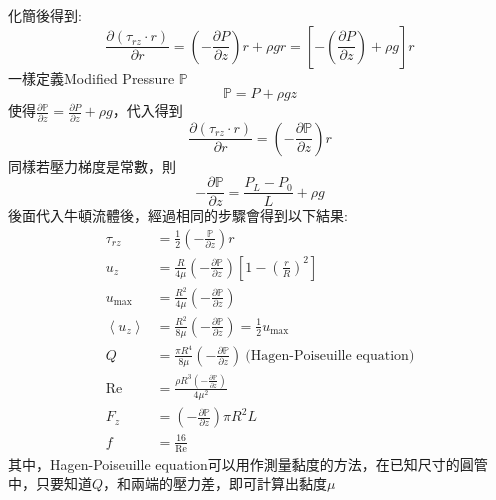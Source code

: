 \documentclass[../main.tex]{subfiles}
\begin{document}
\begin{itemize}
\begin{equation}
    \end{equation}
    化簡後得到:
    \begin{equation}
      \frac{\partial\left(\tau_{rz}\cdot r\right)}{\partial r} = 
      \left(-\frac{\partial P}{\partial z}\right)r + \rho g r = \left[
        -\left(\frac{\partial P}{\partial z}\right) + \rho g
      \right]r
    \end{equation}
    一樣定義Modified Pressure $\mathbb{P}$
    \begin{equation}
      \mathbb{P} = P + \rho g z
    \end{equation}
    使得$\frac{\partial \mathbb{P}}{\partial z} = \frac{\partial P}{\partial z} + \rho g$，代入得到
    \begin{equation}
      \frac{\partial\left(\tau_{rz}\cdot r\right)}{\partial r} = \left(-\frac{\partial \mathbb{P}}{\partial z}\right)r
    \end{equation}
    同樣若壓力梯度是常數，則
    \begin{equation}
      -\frac{\partial \mathbb{P}}{\partial z} = \frac{P_L-P_0}{L} + \rho g
    \end{equation}
    後面代入牛頓流體後，經過相同的步驟會得到以下結果:
    \begin{align}
      \tau_{rz} &= \boxed{\frac{1}{2}\left(-\frac{\mathbb P}{\partial z}\right)r} \label{eq:ch2_laminar_flow_circular_pipe_shear_stress}\\
      u_z & = \boxed{\frac{R}{4\mu}\left(-\frac{\partial \mathbb P}{\partial z}\right)\left[
        1-\left(\frac{r}{R}\right)^2
      \right]} \\
      u_{\text{max}} &= \boxed{\frac{R^2}{4\mu}\left(-\frac{\partial \mathbb P}{\partial z}\right)} \\
      \left<u_z\right> &= \frac{R^2}{8\mu}\left(-\frac{\partial \mathbb P}{\partial z}\right)  = \boxed{\frac{1}{2}u_{\text{max}}}\\
      Q &= \boxed{\frac{\pi R^4}{8\mu}\left(-\frac{\partial \mathbb P}{\partial z}\right) ~\text{(Hagen-Poiseuille equation)}} \\
      \text{Re} &= \frac{\rho R^3\left(-\frac{\partial \mathbb P}{\partial z}\right)}{4\mu^2}\\
      F_z &= \boxed{\left(-\frac{\partial \mathbb P}{\partial z}\right)\pi R^2L} \\
      f &= \boxed{\frac{16}{\text{Re}}}
    \end{align}
    其中，Hagen-Poiseuille equation可以用作測量黏度的方法，在已知尺寸的圓管中，只要知道$Q$，和兩端的壓力差，即可計算出黏度$\mu$\\

\end{itemize}
\end{document}
